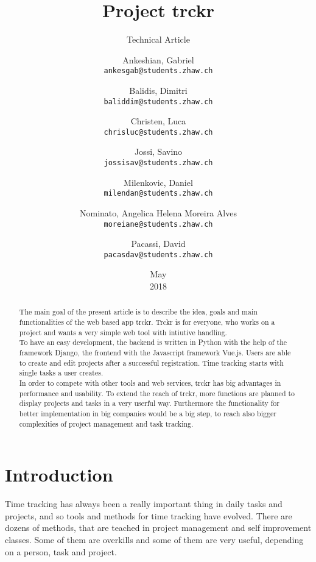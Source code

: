 \documentclass[a4paper, 12pt, headsepline]{scrartcl}
\title{Project trckr}
\subtitle{Technical Article}
\date{May \\ 2018}
\author{
Ankeshian, Gabriel\\
\texttt{ankesgab@students.zhaw.ch}
\and
Balidis, Dimitri\\
\texttt{baliddim@students.zhaw.ch}
\and
Christen, Luca\\
\texttt{chrisluc@students.zhaw.ch}
\and
Jossi, Savino\\
\texttt{jossisav@students.zhaw.ch}
\and
Milenkovic, Daniel\\
\texttt{milendan@students.zhaw.ch}
\and
Nominato, Angelica Helena Moreira Alves\\
\texttt{moreiane@students.zhaw.ch}
\and
Pacassi, David\\
\texttt{pacasdav@students.zhaw.ch}}
\begin{document}
\maketitle
\pagebreak

\begin{abstract}
The main goal of the present article is to describe the idea, goals and main functionalities of the web based app trckr. Trckr is for everyone,
who works on a project and wants a very simple web tool with intiutive handling.\\
To have an easy development, the backend is written in Python with the help of the framework Django, the frontend with the Javascript
framework Vue.js. Users are able to create and edit projects after a successful registration. Time tracking starts with single tasks
a user creates.\\
In order to compete with other tools and web services, trckr has big advantages in performance and usability. To extend the reach of trckr, more
functions are planned to display projects and tasks in a very userful way. Furthermore the functionality for better implementation in big
companies would be a big step, to reach also bigger complexities of project management and task tracking.

\end{abstract}

\pagebreak


\tableofcontents

\pagebreak

\section{Introduction}
Time tracking has always been a really important thing in daily tasks and projects, and so tools and methods for time tracking have evolved.
There are dozens of methods, that are teached in project management and self improvement classes. Some of them are overkills and some of them are
very useful, depending on a person, task and project.
\end{document}
